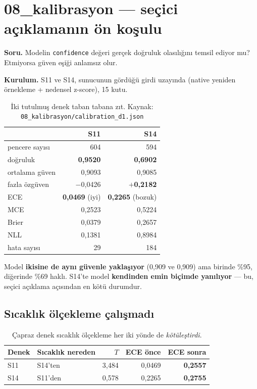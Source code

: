 \documentclass[11pt,a4paper]{report}
\newcommand{\kod}[1]{\texttt{\small #1}}
\newcommand{\dosya}[1]{\texttt{\footnotesize #1}}
\begin{document}
\section{08\_kalibrasyon --- seçici açıklamanın ön koşulu}

\textbf{Soru.} Modelin \kod{confidence} değeri gerçek doğruluk olasılığını
temsil ediyor mu? Etmiyorsa güven eşiği anlamsız olur.

\textbf{Kurulum.} S11 ve S14, sunucunun gördüğü girdi uzayında (native yeniden
örnekleme + nedensel z-score), 15 kutu.

\begin{table}[H]
\centering\small
\begin{tabular}{@{}lrr@{}}
\toprule
& \textbf{S11} & \textbf{S14} \\
\midrule
pencere sayısı      & 604 & 594 \\
doğruluk            & \textbf{0{,}9520} & \textbf{0{,}6902} \\
ortalama güven      & 0{,}9093 & 0{,}9085 \\
fazla özgüven       & $-$0{,}0426 & \textbf{$+$0{,}2182} \\
ECE                 & \textbf{0{,}0469} (iyi) & \textbf{0{,}2265} (bozuk) \\
MCE                 & 0{,}2523 & 0{,}5224 \\
Brier               & 0{,}0379 & 0{,}2657 \\
NLL                 & 0{,}1381 & 0{,}8984 \\
hata sayısı         & 29 & 184 \\
\bottomrule
\end{tabular}
\caption{İki tutulmuş denek taban tabana zıt.
Kaynak: \dosya{08\_kalibrasyon/calibration\_d1.json}}
\end{table}

\begin{bulgu}
Model \textbf{ikisine de aynı güvenle yaklaşıyor} (0{,}909 ve 0{,}909) ama
birinde \%95, diğerinde \%69 haklı. S14'te model \textbf{kendinden emin biçimde
yanılıyor} --- bu, seçici açıklama açısından en kötü durumdur.
\end{bulgu}

\subsection{Sıcaklık ölçekleme çalışmadı}

\begin{table}[H]
\centering\small
\begin{tabular}{@{}llrrr@{}}
\toprule
\textbf{Denek} & \textbf{Sıcaklık nereden} & \textbf{$T$} & \textbf{ECE önce} & \textbf{ECE sonra} \\
\midrule
S11 & S14'ten & 3{,}484 & 0{,}0469 & \textbf{0{,}2557} \\
S14 & S11'den & 0{,}578 & 0{,}2265 & \textbf{0{,}2755} \\
\bottomrule
\end{tabular}
\caption{Çapraz denek sıcaklık ölçekleme her iki yönde de \emph{kötüleştirdi}.}
\end{table}
\end{document}
